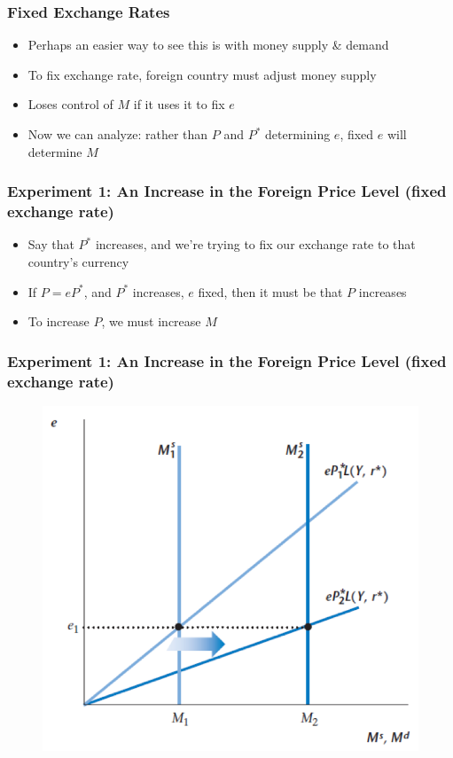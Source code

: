 \documentclass{beamer}
\begin{document}
\begin{frame}
\frametitle[alignment=center]{ Fixed Exchange Rates}
\begin{itemize}
\item Perhaps an easier way to see this is with money supply \& demand
\bigskip
\item To fix exchange rate, foreign country must adjust money supply 
\bigskip
\item Loses control of $M$ if it uses it to fix $e$
\bigskip
\item Now we can analyze:  rather than $P$ and $P^*$ determining $e$, fixed $e$ will determine $M$
\end{itemize}
\end{frame}


\begin{frame}
\frametitle[alignment=center]{ Experiment 1:  An Increase in the Foreign Price Level (fixed exchange rate)}
\begin{itemize}
\item Say that $P^*$ increases, and we're trying to fix our exchange rate to that country's currency
\bigskip
\item If $P=eP^*$, and $P^*$ increases, $e$ fixed, then it must be that $P$ increases
\bigskip
\item To increase $P$, we must increase $M$
\end{itemize}
\end{frame}



\begin{frame}
\frametitle[alignment=center]{Experiment 1:  An Increase in the Foreign Price Level (fixed exchange rate)}
\begin{figure}
\centering
\includegraphics[scale=0.75]{Figures/W_Fig_17pt8.png}
\end{figure}
\end{frame}
\end{document}
